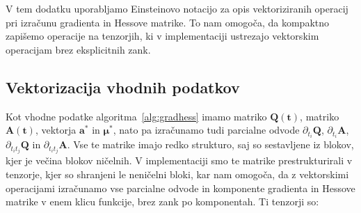 \documentclass[mat2, tisk]{fmfdelo}
\newcommand{\qmat}{\mathbf{Q}}
\newcommand{\amat}{\mathbf{A}}
\newcommand{\avec}{\mathbf{a}}
\newcommand{\tvec}{\mathbf{t}}
\newcommand{\muvec}{\boldsymbol{\mu}}
\begin{document}
V tem dodatku uporabljamo Einsteinovo notacijo za opis vektoriziranih operacij pri izračunu gradienta in Hessove matrike. To nam omogoča, da kompaktno zapišemo operacije na tenzorjih, ki v implementaciji ustrezajo vektorskim operacijam brez eksplicitnih zank.

\subsection{Vektorizacija vhodnih podatkov}
Kot vhodne podatke algoritma~\ref{alg:gradhess} imamo matriko $\qmat(\tvec)$, matriko $\amat(\tvec)$, vektorja $\avec^*$ in $\muvec^*$, nato pa izračunamo tudi parcialne odvode $\partial_{t_i}\qmat$, $\partial_{t_i} \amat$, $\partial_{t_it_j}\qmat$ in $\partial_{t_it_j}\amat$. Vse te matrike imajo redko strukturo, saj so sestavljene iz blokov, kjer je večina blokov ničelnih. V implementaciji smo te matrike prestrukturirali v tenzorje, kjer so shranjeni le neničelni bloki, kar nam omogoča, da z vektorskimi operacijami izračunamo vse parcialne odvode in komponente gradienta in Hessove matrike v enem klicu funkcije, brez zank po komponentah. Ti tenzorji so:
\end{document}

